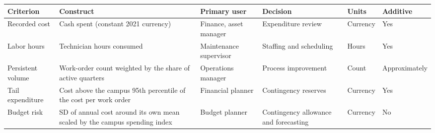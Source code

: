 \begin{tabular}{p{2.3cm}p{3.2cm}p{2.3cm}p{2.6cm}p{1.3cm}p{1.9cm}}
\toprule
Criterion & Construct & Primary user & Decision & Units & Additive \\
\midrule
Recorded cost & Cash spent (constant 2021 currency) & Finance, asset manager & Expenditure review & Currency & Yes \\
Labor hours & Technician hours consumed & Maintenance supervisor & Staffing and scheduling & Hours & Yes \\
Persistent volume & Work-order count weighted by the share of active quarters & Operations manager & Process improvement & Count & Approximately \\
Tail expenditure & Cost above the campus 95th percentile of the cost per work order & Financial planner & Contingency reserves & Currency & Yes \\
Budget risk & SD of annual cost around its own mean scaled by the campus spending index & Budget planner & Contingency allowance and forecasting & Currency & No \\
\bottomrule
\end{tabular}
